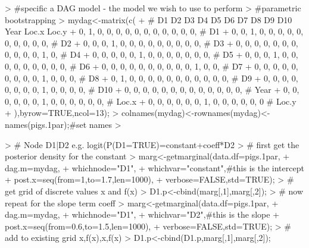 \documentclass[nojss]{jss}
\begin{document}
\begin{Schunk}
\begin{Sinput}
> #specific a DAG model - the model we wish to use to perform 
> #parametric bootstrapping
> mydag<-matrix(c(
+ # D1 D2 D3 D4 D5 D6 D7 D8 D9 D10 Year Loc.x Loc.y
+   0, 1, 0, 0, 0, 0, 0, 0, 0, 0,  0,   0,    0,    # D1
+   0, 0, 1, 0, 0, 0, 0, 0, 0, 0,  0,   0,    0,    # D2
+   0, 0, 0, 1, 0, 0, 0, 0, 0, 0,  0,   0,    0,    # D3
+   0, 0, 0, 0, 0, 0, 0, 0, 0, 0,  0,   1,    0,    # D4
+   0, 0, 0, 0, 0, 1, 0, 0, 0, 0,  0,   0,    0,    # D5
+   0, 0, 0, 1, 0, 0, 0, 0, 0, 0,  0,   0,    0,    # D6
+   0, 0, 0, 0, 0, 0, 0, 0, 0, 0,  1,   0,    0,    # D7
+   0, 0, 0, 0, 0, 0, 0, 0, 0, 1,  0,   0,    0,    # D8
+   0, 1, 0, 0, 0, 0, 0, 0, 0, 0,  0,   0,    0,    # D9
+   0, 0, 0, 0, 0, 0, 0, 0, 1, 0,  0,   0,    0,    # D10
+   0, 0, 0, 0, 0, 0, 0, 0, 0, 0,  0,   0,    0,    # Year
+   0, 0, 0, 0, 0, 0, 1, 0, 0, 0,  0,   0,    0,    # Loc.x
+   0, 0, 0, 0, 0, 0, 1, 0, 0, 0,  0,   0,    0     # Loc.y
+                                                ),byrow=TRUE,ncol=13); 
> colnames(mydag)<-rownames(mydag)<-names(pigs.1par);#set names
> 
\end{Sinput}
\end{Schunk}
\begin{Schunk}
\begin{Sinput}
> # Node D1|D2 e.g. logit(P(D1=TRUE)=constant+coeff*D2
> # first get the posterior density for the constant
> marg<-getmarginal(data.df=pigs.1par,
+                    dag.m=mydag,
+                    whichnode="D1",
+                    whichvar="constant",#this is the intercept
+                      post.x=seq(from=1,to=1.7,len=1000),
+                      verbose=FALSE,std=TRUE);
> # get grid of discrete values x and f(x)
> D1.p<-cbind(marg[,1],marg[,2]);
> # now repeat for the slope term coeff
> marg<-getmarginal(data.df=pigs.1par,
+                    dag.m=mydag,
+                    whichnode="D1",
+                    whichvar="D2",#this is the slope
+                      post.x=seq(from=0.6,to=1.5,len=1000),
+                      verbose=FALSE,std=TRUE);
> # add to existing grid x,f(x),x,f(x)
> D1.p<-cbind(D1.p,marg[,1],marg[,2]);
\end{Sinput}
\end{Schunk}
\end{document}
